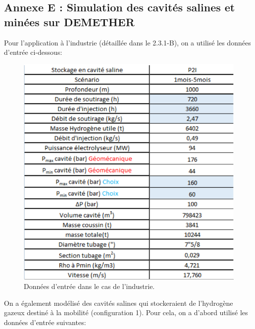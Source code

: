 \documentclass[11pt,french,a4paper]{article}
\begin{document}
\FloatBarrier
\subsection*{Annexe E : Simulation des cavités salines et minées sur DEMETHER} 

Pour l'application à l'industrie (détaillée dans le 2.3.1-B), on a utilisé les données d'entrée ci-dessous:

\begin{figure}[h]
  \centering
  \includegraphics[width=0.65\linewidth]{image/annexe/cav_sal/ind.png}
  \caption{Données d'entrée dans le cas de l'industrie.}
  \end{figure}
\FloatBarrier
On a également modélisé des cavités salines qui stockeraient de l'hydrogène gazeux destiné à la mobilité (configuration 1). Pour cela, on a d'abord utilisé les données d'entrée suivantes:
\end{document}

